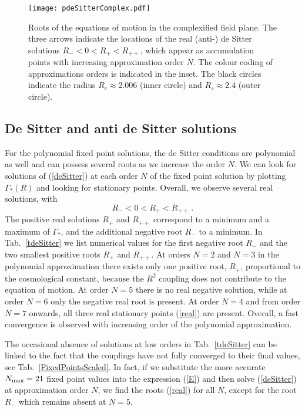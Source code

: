 \documentclass[notitlepage,eqsecnum,bm,amsmath,preprintnumbers,superscriptaddress,nofootinbib,aps,11pt]{revtex4-1}
\def\eq#1{(\ref{#1})}
\def\R{\rho}
\def\R{R}
\def\beq{\begin{equation}}
\def\eeq{\end{equation}}
\begin{document}
\begin{figure*}[t]
\begin{center}
\texttt{[image: pdeSitterComplex.pdf]}
\caption{\label{deSitterComplex}
Roots of the equations of motion in the complexified field plane. The three arrows indicate the locations of the real (anti-) de Sitter solutions $\R_-<0<\R_+<\R_{++}$, which appear as accumulation points with increasing approximation order $N$. The colour coding of approximations orders is indicated in the inset. The black circles indicate the radius $R_c\approx 2.006$ (inner circle) and $R_s\approx 2.4$ (outer circle).      }
\end{center}
\end{figure*}

 
   \subsection{De Sitter and anti de Sitter solutions}
  For the polynomial fixed point solutions, the de Sitter conditions  are polynomial as well and can possess several roots as we increase the order $N$.   We can look for 
 solutions of \eq{deSitter} at each order $N$ of the fixed point solution by plotting $\Gamma_*(\R)$ and 
 looking for stationary points. 
  Overall, we observe several real solutions, with
 \beq\label{real}
 \R_-<0<\R_+<\R_{++} \,.
 \eeq
 The positive real solutions $\R_+$ and $\R_{++}$ correspond to a minimum and a maximum of $\Gamma_*$, and the additional   negative root $\R_{-}$ to a minimum. 
  In Tab.~\ref{tdeSitter} we list numerical values for the first negative root $\R_{-}$ and the two smallest 
 positive roots $\R_{+}$ and $\R_{++}$. At orders $N=2$ and $N=3$ in the polynomial approximation there exists only one positive root, $\R_{+}$, proportional to the cosmological constant, because the $R^2$ coupling does not contribute to the equation of motion. At order $N=5$ there is no real negative solution, while at order $N=6$ only the negative real root is present. At order $N=4$ and from order $N=7$ onwards, all three real stationary points \eq{real}  
 are present. Overall, a fast convergence is observed with increasing order of the polynomial approximation. 
 
 The occasional absence of solutions at low orders in Tab.~\ref{tdeSitter} can be linked to the fact that the couplings  have not fully converged to their final values, see Tab.~\ref{FixedPointsScaled}. In fact, if we substitute the more accurate $N_{\rm max}=21$ fixed point values into the expression \eq{E} and then solve \eq{deSitter} at approximation order $N$, we find the roots \eq{real} for all $N$, except for the root $\R_{-}$ which remains absent at $N=5$.
 
\end{document}
